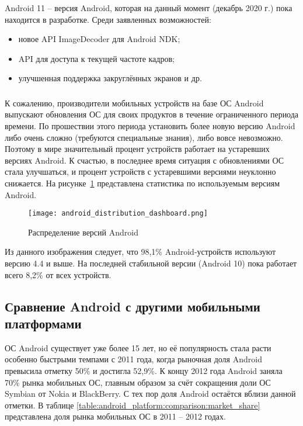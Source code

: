Android 11 -- версия Android, которая на данный момент (декабрь 2020 г.) пока находится в разработке.
Среди заявленных возможностей:
\begin{itemize}
	\item новое API ImageDecoder для Android NDK;
	\item API для доступа к текущей частоте кадров;
	\item улучшенная поддержка закруглённых экранов и др. \cite{android_11}
\end{itemize}

\subsubsection*{}
\label{subsub:android_platform:history:distribution}

К сожалению, производители мобильных устройств на базе ОС Android выпускают обновления ОС для своих продуктов в течение ограниченного периода времени.
По прошествии этого периода установить более новую версию Android либо очень сложно (требуются специальные знания), либо вовсе невозможно.
Поэтому в мире значительный процент устройств работает на устаревших версиях Android.
К счастью, в последнее время ситуация с обновлениями ОС стала улучшаться, и процент устройств с устаревшими версиями неуклонно снижается.
На рисунке~\ref{fig:android_distribution_dashboard} представлена статистика по используемым версиям Android.

\begin{figure}[ht]
    \centering
    \texttt{[image: android\_distribution\_dashboard.png]}
	\caption{Распределение версий Android \cite{android_about_dashboards}}
	\label{fig:android_distribution_dashboard}
\end{figure}

Из данного изображения следует, что 98,1\% Android-устройств используют версию 4.4 и выше.
На последней стабильной версии (Android 10) пока работает всего 8,2\% от всех устройств.

\subsection{Сравнение Android с другими мобильными платформами} \label{sub:android_platform:comparison}

ОС Android существует уже более 15 лет, но её популярность стала расти особенно быстрыми темпами с 2011 года, когда рыночная доля Android превысила отметку 50\% и достигла 52,9\%.
К концу 2012 года Android заняла 70\% рынка мобильных ОС, главным образом за счёт сокращения доли ОС Symbian от Nokia и BlackBerry.
С тех пор доля Android остаётся вблизи данной отметки.
В таблице \ref{table:android_platform:comparison:market_share} представлена доля рынка мобильных ОС в 2011 -- 2012 годах. \cite{comparative_study_of_mobile_oses_2016}

